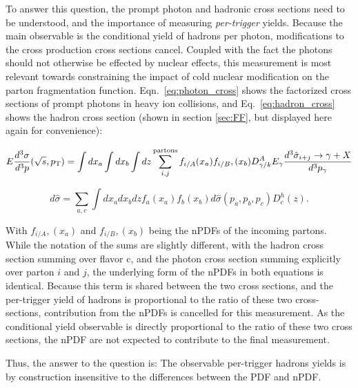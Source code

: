 To answer this question, the prompt photon and hadronic cross sections need to be understood, and the importance of measuring  \textit{per-trigger} yields. Because the main observable is the conditional yield of hadrons per photon, modifications to the cross production cross sections cancel. Coupled with the fact the photons should not otherwise be effected by nuclear effects, this measurement is most relevant towards constraining the impact of cold nuclear modification on the parton fragmentation function. Eqn.~\ref{eq:photon_cross} shows the factorized cross sections of prompt photons in heavy ion collisions, and Eq.~\ref{eq:hadron_cross} shows the hadron cross section (shown in section \ref{sec:FF}, but displayed here again for convenience):

  \begin{equation}
    E\frac{d^3\sigma}{d^3p}(\sqrt{s},p_{\mathrm{T}}) = \int dx_a \int dx_b \int dz \sum^\mathrm{partons}_{i,j}f_{i/A}(x_a)f_{i/B},(x_b) D_{\gamma/k}^{A}E_{\gamma}\frac{d^3\hat{\sigma}_{i+j}\rightarrow\gamma+X}{d^3p_{\gamma}}
    \label{eq:photon_cross}
  \end{equation}

  \begin{equation}
    d\hat{\sigma}= \sum_{a,c} \int dx_a dx_b dz f_a(x_a) f_b(x_b) d\hat{\sigma}(p_a,p_b,p_c) D_c^h(z).
    \label{eq:hadron_cross}
  \end{equation}

With $f_{i/A},(x_a)$ and  $f_{i/B},(x_b)$ being the nPDFs of the incoming partons. While the notation of the sums are slightly different, with the hadron cross section summing over flavor c, and the photon cross section summing explicitly over parton $i$ and $j$, the underlying form of the nPDFs in both equations is identical. Because this term is shared between the two cross sections, and the per-trigger yield of hadrons is proportional to the ratio of these two cross-sections, contribution from the nPDFs is cancelled for this measurement. As the conditional yield observable is directly proportional to the ratio of these two cross sections, the nPDF are not expected to contribute to the final measurement.

Thus, the answer to the question is: The observable per-trigger hadrons yields is by construction insensitive to the differences between the PDF and nPDF.


